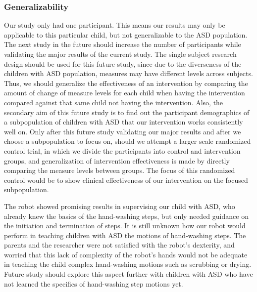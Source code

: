 \subsubsection{Generalizability}
Our study only had one participant.  This means our results may only be applicable to this particular child, but not generalizable to the ASD population.  The next study in the future should increase the number of participants while validating the major results of the current study.  The single subject research design should be used for this future study, since due to the diverseness of the children with ASD population, measures may have different levels across subjects.  Thus, we should generalize the effectiveness of an intervention by comparing the amount of change of measure levels for each child when having the intervention compared against that same child not having the intervention.  Also, the secondary aim of this future study is to find out the participant demographics of a subpopulation of children with ASD that our intervention works consistently well on.  Only after this future study validating our major results and after we choose a subpopulation to focus on, should we attempt a larger scale randomized control trial, in which we divide the participants into control and intervention groups, and generalization of intervention effectiveness is made by directly comparing the measure levels between groups.  The focus of this randomized control would be to show clinical effectiveness of our intervention on the focused subpopulation.

The robot showed promising results in supervising our child with ASD, who already knew the basics of the hand-washing steps, but only needed guidance on the initiation and termination of steps.  It is still unknown how our robot would perform in teaching children with ASD the motions of hand-washing steps.  The parents and the researcher were not satisfied with the robot's dexterity, and worried that this lack of complexity of the robot's hands would not be adequate in teaching the child complex hand-washing motions such as scrubbing or drying.  Future study should explore this aspect further with children with ASD who have not learned the specifics of hand-washing step motions yet.

